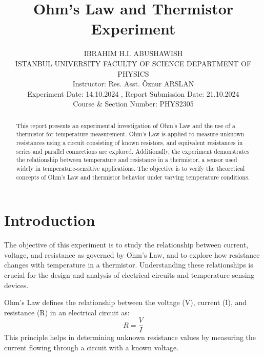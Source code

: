 \documentclass[journal]{IEEEtran}
\begin{document}
\title{Ohm’s Law and Thermistor Experiment}
\author{IBRAHIM H.I. ABUSHAWISH\\
ISTANBUL UNIVERSITY
FACULTY OF SCIENCE
DEPARTMENT OF PHYSICS \\
Instructor: Res. Asst. Öznur ARSLAN \\
Experiment Date: 14.10.2024 , Report Submission Date: 21.10.2024 \\
Course \& Section Number: PHYS2305}

\maketitle

\maketitle

\begin{abstract}
This report presents an experimental investigation of Ohm's Law and the use of a thermistor for temperature measurement. Ohm's Law is applied to measure unknown resistances using a circuit consisting of known resistors, and equivalent resistances in series and parallel connections are explored. Additionally, the experiment demonstrates the relationship between temperature and resistance in a thermistor, a sensor used widely in temperature-sensitive applications. The objective is to verify the theoretical concepts of Ohm's Law and thermistor behavior under varying temperature conditions.
\end{abstract}

\section{Introduction}
The objective of this experiment is to study the relationship between current, voltage, and resistance as governed by Ohm’s Law, and to explore how resistance changes with temperature in a thermistor. Understanding these relationships is crucial for the design and analysis of electrical circuits and temperature sensing devices.

Ohm's Law defines the relationship between the voltage (V), current (I), and resistance (R) in an electrical circuit as:
\begin{equation}
    R = \frac{V}{I}
\end{equation}
This principle helps in determining unknown resistance values by measuring the current flowing through a circuit with a known voltage.
\end{document}
